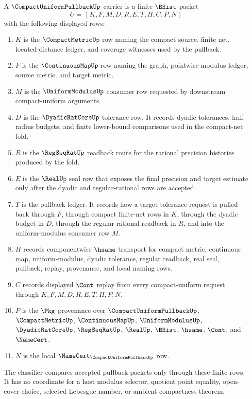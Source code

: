 \begin{definition}
\label{def:compact-uniform-pullback-carrier}
A $\CompactUniformPullbackUp$ carrier is a finite $\BHist$ packet
$$
U=(K,F,M,D,R,E,T,H,C,P,N)
$$
with the following displayed rows:
\begin{enumerate}
\item $K$ is the $\CompactMetricUp$ row naming the compact source, finite net, located-distance ledger, and coverage witnesses used by the pullback.
\item $F$ is the $\ContinuousMapUp$ row naming the graph, pointwise-modulus ledger, source metric, and target metric.
\item $M$ is the $\UniformModulusUp$ consumer row requested by downstream compact-uniform arguments.
\item $D$ is the $\DyadicRatCoreUp$ tolerance row. It records dyadic tolerances, half-radius budgets, and finite lower-bound comparisons used in the compact-net fold.
\item $R$ is the $\RegSeqRatUp$ readback route for the rational precision histories produced by the fold.
\item $E$ is the $\RealUp$ seal row that exposes the final precision and target estimate only after the dyadic and regular-rational rows are accepted.
\item $T$ is the pullback ledger. It records how a target tolerance request is pulled back through $F$, through compact finite-net rows in $K$, through the dyadic budget in $D$, through the regular-rational readback in $R$, and into the uniform-modulus consumer row $M$.
\item $H$ records componentwise $\hsame$ transport for compact metric, continuous map, uniform-modulus, dyadic tolerance, regular readback, real seal, pullback, replay, provenance, and local naming rows.
\item $C$ records displayed $\Cont$ replay from every compact-uniform request through $K,F,M,D,R,E,T,H,P,N$.
\item $P$ is the $\Pkg$ provenance over $\CompactUniformPullbackUp$, $\CompactMetricUp$, $\ContinuousMapUp$, $\UniformModulusUp$, $\DyadicRatCoreUp$, $\RegSeqRatUp$, $\RealUp$, $\BHist$, $\hsame$, $\Cont$, and $\NameCert$.
\item $N$ is the local $\NameCert_{\CompactUniformPullbackUp}$ row.
\end{enumerate}
The classifier compares accepted pullback packets only through these finite rows. It has no coordinate for a host modulus selector, quotient point equality, open-cover choice, selected Lebesgue number, or ambient compactness theorem.
\end{definition}

